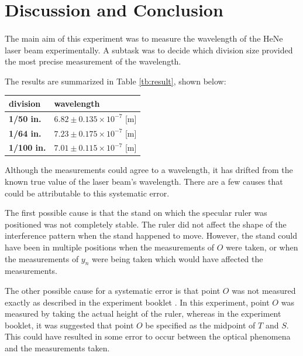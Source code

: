 \documentclass{article}
\begin{document}
\section{Discussion and Conclusion}
\paragraph{}
The main aim of this experiment was to measure the wavelength of the HeNe laser beam experimentally. A subtask was to decide which division size provided the most precise measurement of the wavelength.

The results are summarized in Table \ref{tb:result}, shown below:

\begin{table}[H]
\begin{tabular}{|l|l|}
\hline
\textbf{division}  & \textbf{wavelength}                 \\ \hline
\textbf{1/50 in.}  & $6.82 \pm 0.135 \times 10^{-7}$ [m] \\ \hline
\textbf{1/64 in.}  & $7.23 \pm 0.175 \times 10^{-7}$ [m] \\ \hline
\textbf{1/100 in.} & $7.01 \pm 0.115 \times 10^{-7}$ [m] \\ \hline
\end{tabular}
\end{table}

Although the measurements could agree to a wavelength, it has drifted from the known true value of the laser beam's wavelength. There are a few causes that could be attributable to this systematic error.

The first possible cause is that the stand on which the specular ruler was positioned was not completely stable. The ruler did not affect the shape of the interference pattern when the stand happened to move. However, the stand could have been in multiple positions when the measurements of $O$ were taken, or when the measurements of $y_n$ were being taken which would have affected the measurements.

The other possible cause for a systematic error is that point $O$ was not measured exactly as described in the experiment booklet \autocite{UPCSE2018}. In this experiment, point $O$ was measured by taking the actual height of the ruler, whereas in the experiment booklet, it was suggested that point $O$ be specified as the midpoint of $T$ and $S$. This could have resulted in some error to occur between the optical phenomena and the measurements taken.
\end{document}
